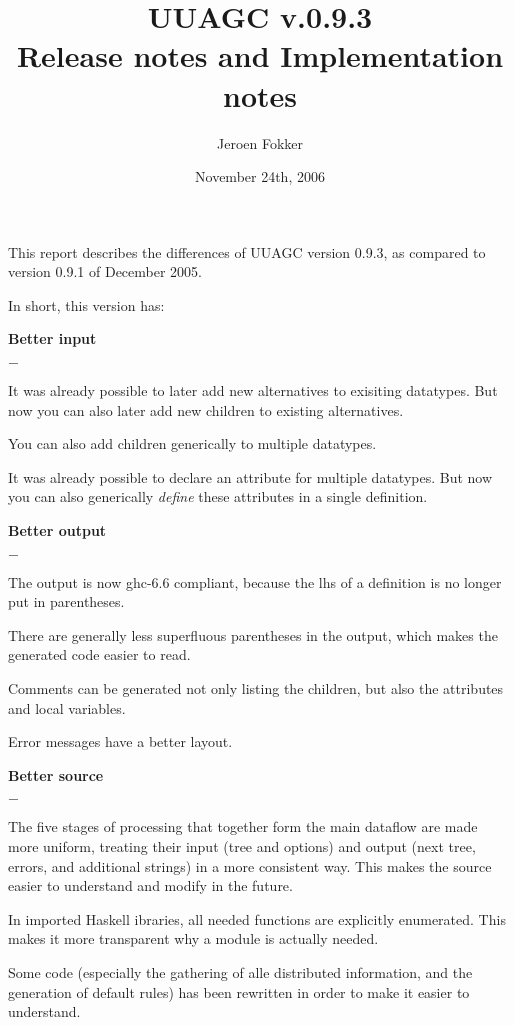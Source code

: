 \documentclass[twoside]{article}
\newenvironment{subitize}{\begin{list}{$-$}{\parsep=0pt\parskip=0pt\topsep=0pt\itemsep=0pt}}{\end{list}}
\begin{document}
\title{UUAGC v.0.9.3\\Release notes and Implementation notes}
\author{Jeroen Fokker}
\date{November 24th, 2006}
\maketitle

This report describes the differences of UUAGC version 0.9.3,
as compared to version 0.9.1 of December 2005.

In short, this version has:
\begin{itemize}
\item {\bf Better input}\\
	\begin{subitize}
	\item It was already possible to later add new alternatives to exisiting datatypes.
	      But now you can also later add new children to existing alternatives.
	\item You can also add children generically to multiple datatypes.
	\item It was already possible to declare an attribute for multiple datatypes.
	      But now you can also generically {\em define} these attributes in a single definition.
	\end{subitize}	      
\item {\bf Better output}
	\begin{subitize}
	\item The output is now ghc-6.6 compliant, because the lhs of a definition is no longer put in parentheses.
	\item There are generally less superfluous parentheses in the output,
	      which makes the generated code easier to read.
	\item Comments can be generated not only listing the children, but also the attributes and local variables.
	\item Error messages have a better layout.
	\end{subitize}
\item {\bf Better source}
	\begin{subitize}
	\item The five stages of processing that together form the main dataflow are made more uniform,
	      treating their input (tree and options) and output (next tree, errors, and additional strings)
	      in a more consistent way. This makes the source easier to understand and modify in the future.
	\item In imported Haskell ibraries, all needed functions are explicitly enumerated.
	      This makes it more transparent why a module is actually needed.
	\item Some code (especially the gathering of alle distributed information, and the generation of default rules)
	      has been rewritten in order to make it easier to understand.
    \end{subitize}
\end{itemize}
\end{document}
